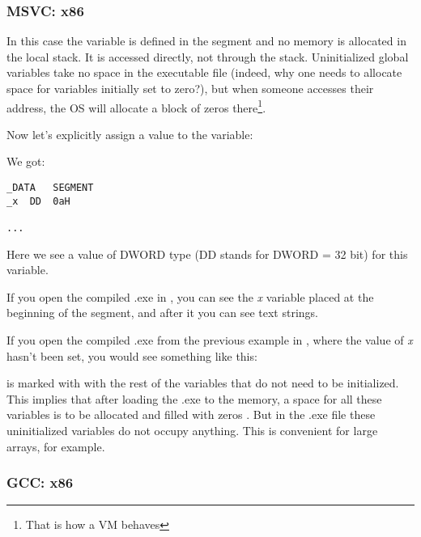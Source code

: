 \subsubsection{MSVC: x86}



In this case the  variable is defined in the  segment and no memory is allocated in the local stack. It is accessed directly, not through the stack. 
Uninitialized global variables take no space in the executable file
(indeed, why one needs to allocate space for variables initially set to zero?), 
but when someone accesses their address, 
the \ac{OS} will allocate a block of zeros there\footnote{That is how a \ac{VM} behaves}.

Now let's explicitly assign a value to the variable:



We got:

\begin{lstlisting}[style=customasmx86]
_DATA	SEGMENT
_x	DD	0aH

...
\end{lstlisting}

Here we see a value  of DWORD type (DD stands for DWORD = 32 bit) for this variable.

If you open the compiled .exe in \IDA, you can see the \emph{x} variable placed at the beginning of 
the  segment, and after it you can see text strings.

If you open the compiled .exe from the previous example in \IDA, where the value of \emph{x} hasn't been set, you would see something like this:



\label{BSSClearedByCStd}
 is marked with  with the rest of the variables that do not need to be initialized. 
This implies that after loading the .exe to the memory, a space for all these variables is to be 
allocated and filled with zeros .
But in the .exe file these uninitialized variables do not occupy anything.
This is convenient for large arrays, for example.



\subsubsection{GCC: x86}

